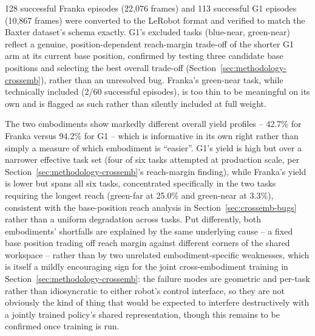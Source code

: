 \documentclass[12pt]{article}
\begin{document}
128 successful Franka episodes (22{,}076 frames) and 113 successful G1 episodes (10{,}867 frames) were converted to the LeRobot format and verified to match the Baxter dataset's schema exactly. G1's excluded tasks (blue-near, green-near) reflect a genuine, position-dependent reach-margin trade-off of the shorter G1 arm at its current base position, confirmed by testing three candidate base positions and selecting the best overall trade-off (Section~\ref{sec:methodology-crossemb}), rather than an unresolved bug. Franka's green-near task, while technically included (2/60 successful episodes), is too thin to be meaningful on its own and is flagged as such rather than silently included at full weight.

The two embodiments show markedly different overall yield profiles -- 42.7\% for Franka versus 94.2\% for G1 -- which is informative in its own right rather than simply a measure of which embodiment is ``easier''. G1's yield is high but over a narrower effective task set (four of six tasks attempted at production scale, per Section~\ref{sec:methodology-crossemb}'s reach-margin finding), while Franka's yield is lower but spans all six tasks, concentrated specifically in the two tasks requiring the longest reach (green-far at 25.0\% and green-near at 3.3\%), consistent with the base-position reach analysis in Section~\ref{sec:crossemb-bugs} rather than a uniform degradation across tasks. Put differently, both embodiments' shortfalls are explained by the same underlying cause -- a fixed base position trading off reach margin against different corners of the shared workspace -- rather than by two unrelated embodiment-specific weaknesses, which is itself a mildly encouraging sign for the joint cross-embodiment training in Section~\ref{sec:methodology-crossemb}: the failure modes are geometric and per-task rather than idiosyncratic to either robot's control interface, so they are not obviously the kind of thing that would be expected to interfere destructively with a jointly trained policy's shared representation, though this remains to be confirmed once training is run.
\end{document}
